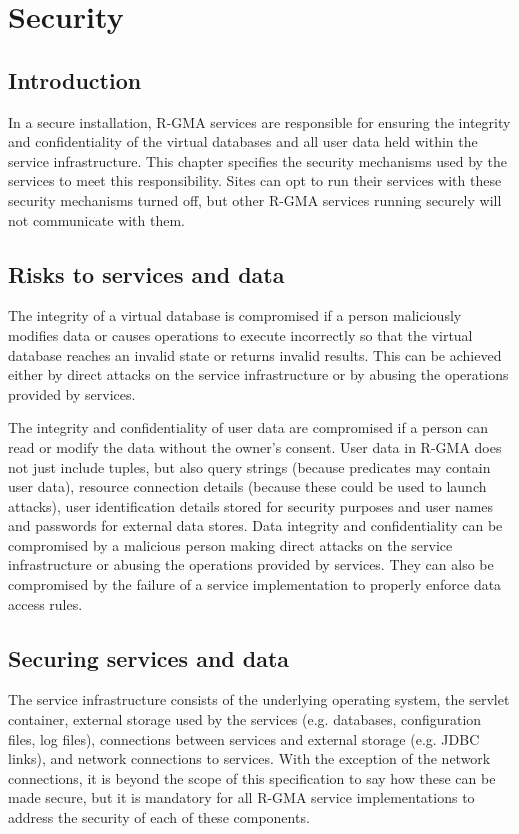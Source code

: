 \section{Security}\label{sec:Security}

\subsection{Introduction}

In a secure installation, R-GMA services are responsible for ensuring
the integrity and confidentiality of the virtual databases and all
user data held within the service infrastructure.  This chapter
specifies the security mechanisms used by the services to meet this
responsibility. Sites can opt to run their services with these
security mechanisms turned off, but other R-GMA services running
securely will not communicate with them.

\subsection{Risks to services and data}

The integrity of a virtual database is compromised if a person
maliciously modifies data or causes operations to execute incorrectly
so that the virtual database reaches an invalid state or returns
invalid results. This can be achieved either by direct attacks on the
service infrastructure or by abusing the operations provided by
services.

The integrity and confidentiality of user data are compromised if a
person can read or modify the data without the owner's consent. User
data in R-GMA does not just include tuples, but also query strings
(because predicates may contain user data), resource connection
details (because these could be used to launch attacks), user
identification details stored for security purposes and user names and
passwords for external data stores.  Data integrity and
confidentiality can be compromised by a malicious person making direct
attacks on the service infrastructure or abusing the operations
provided by services. They can also be compromised by the failure of a
service implementation to properly enforce data access rules.

\subsection{Securing services and data}

The service infrastructure consists of the underlying operating
system, the servlet container, external
storage used by the services (e.g. databases, configuration files, log
files), connections between services and external storage (e.g. JDBC
links), and network connections to services. With the exception of the
network connections, it is beyond the scope of this specification to
say how these can be made secure, but it is mandatory for all R-GMA
service implementations to address the security of each of these
components.

